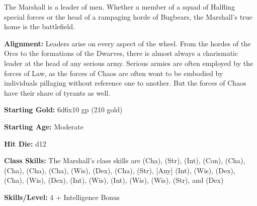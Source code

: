 
The Marshall is a leader of men. Whether a member of a squad of Halfling special forces or the head of a rampaging horde of Bugbears, the Marshall's true home is the battlefield.

\textbf{Alignment:} Leaders arise on every aspect of the wheel. From the hordes of the Orcs to the formations of the Dwarves, there is almost always a charismatic leader at the head of any serious army. Serious armies are often employed by the forces of Law, as the forces of Chaos are often wont to be embodied by individuals pillaging without reference one to another. But the forces of Chaos have their share of tyrants as well.

\textbf{Starting Gold:} 6d6x10 gp (210 gold)

\textbf{Starting Age:} Moderate

\textbf{Hit Die:} d12

\textbf{Class Skills:} The Marshall's class skills are  (Cha),  (Str),  (Int),  (Con),  (Cha),  (Cha),  (Cha),  (Cha),  (Wis),  (Dex),  (Cha),  (Str),  [Any] (Int),  (Wis),  (Dex),  (Cha),  (Wis),  (Dex),  (Int),  (Wis),  (Int),  (Wis),  (Wis),  (Str), and  (Dex)

\textbf{Skills/Level:} 4 + Intelligence Bonus

\goodbab{}
\poorfor{}
\poorref{}
\goodwil{}

\begin{classtable}
\end{classtable}

